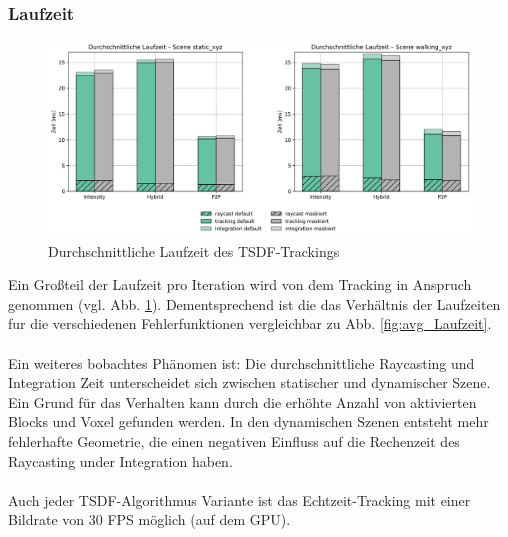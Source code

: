 \documentclass[12pt,DIV=15,BCOR=15mm,twoside,headsepline,abstract=true,listof=totoc,bibliography=totoc]{scrreprt}
\theoremstyle{remark}    %
\begin{document}
    \subsubsection{Laufzeit}
    \begin{figure}[h]
        \centering
        \includegraphics[width=\textwidth]{pics/tsdf_time_avg_split.png}
        \caption{Durchschnittliche Laufzeit des \ac{TSDF}-Trackings}
        \label{fig:tsdf_avg_time}
    \end{figure}\noindent
    Ein Großteil der Laufzeit pro Iteration wird von dem Tracking in Anspruch genommen (vgl. Abb. \ref{fig:tsdf_avg_time}). Dementsprechend ist die das 
    Verhältnis der Laufzeiten fur die verschiedenen Fehlerfunktionen vergleichbar zu Abb. \ref{fig:avg_Laufzeit}. \\\\
    Ein weiteres bobachtes Phänomen ist: Die durchschnittliche Raycasting und Integration Zeit unterscheidet sich zwischen statischer und dynamischer
    Szene. Ein Grund für das Verhalten kann durch die erhöhte Anzahl von aktivierten Blocks und Voxel gefunden werden. In den dynamischen Szenen entsteht
    mehr fehlerhafte Geometrie, die einen negativen Einfluss auf die Rechenzeit des Raycasting under Integration haben. \\\\
    Auch jeder \ac{TSDF}-Algorithmus Variante ist das Echtzeit-Tracking mit einer Bildrate von 30 FPS möglich (auf dem GPU). 
\end{document}
